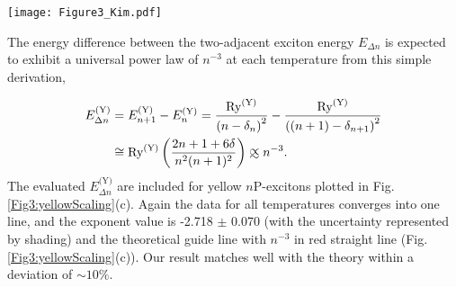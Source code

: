 \documentclass[aps,reprint,amsmath,amssymb,prb]{revtex4-1}
\def\approxprop{%
  \def\p{%
    \setbox0=\vbox{\hbox{$\propto$}}%
    \ht0=0.6ex \box0 }%
  \def\s{%
    \vbox{\hbox{$\sim$}}%
  }%
  \mathrel{\raisebox{0.7ex}{%
      \mbox{$\underset{\s}{\p}$}%
    }}%
}
\begin{document}
\begin{figure*}[htbp]
\centering
\texttt{[image: Figure3\_Kim.pdf]}
\caption{Yellow P-exciton resonances at different temperatures:
(a) $E_{n\text{P}}^{\text{(Y)}}$, excitation resonance energy, (b) $E_{\text{g}}^{\text{(Y)}}-E_{n\text{P}}^{\text{(Y)}}$, exciton binding energy, 
(c) $E_{n+1}^{\text{(Y)}}-E_{n}^{\text{(Y)}}$
(d) $\Gamma_{n\text{P}}^{\text{(Y)}}$, the Full-width at half-maximum of exciton peaks,
(e) $C_{n\text{P}}^{\text{(Y)}}$, the peak areas of asymmetric Lorentzian peaks, and (f) the degree of asymmetry $Q_{n\text{P}}^{\text{(Y)}}$ of exciton resonance. Red straight lines in (b), (c), (d), and (e) represent the theoretical scaling behavior as guidelines, while the light blue lines with shades show the fitting results of the average exponent of $n$ with the statistical standard deviation.}
\label{Fig3:yellowScaling}
\end{figure*}

The energy difference between the two-adjacent exciton energy $E_{\Delta n}$ is expected to exhibit a universal power law of $n^{-3}$ at each temperature from this simple derivation,

\begin{equation}\label{eq10:Edeltan}
\begin{aligned}
E_{\Delta n}^{\text{(Y)}} & = E_{n+1}^{\text{(Y)}}-E_{n}^{\text{(Y)}} =\frac{\text{Ry}^{\text{(Y)}}}{\left(n-\delta_{n}\right)^{2}}-\frac{\text{Ry}^{\text{(Y)}}}{\left((n+1)-\delta_{n+1}\right)^{2}}\\
&\cong \text{Ry}^{\text{(Y)}}\left(\frac{2 n+1+6 \delta}{n^{2}(n+1)^{2}}\right)
\approxprop n^{-3}.
\end{aligned}
\end{equation}
The evaluated $E_{\Delta n}^{\text{(Y)}}$ are included for yellow $n$P-excitons plotted in Fig. \ref{Fig3:yellowScaling}(c). Again the data for all temperatures converges into one line, and the  exponent value is -2.718 $\pm$ 0.070 (with the uncertainty represented by shading) and the theoretical guide line with $n^{-3}$ in red straight line (Fig. \ref{Fig3:yellowScaling}(c)). Our result matches well with the theory within a deviation of $\sim 10 \%$.
\end{document}
